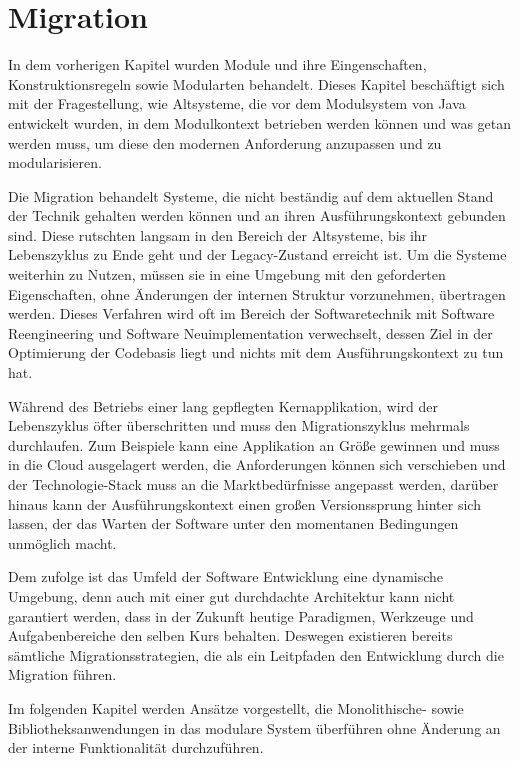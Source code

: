 \chapter{Migration}

	In dem vorherigen Kapitel wurden Module und ihre Eingenschaften, Konstruktionsregeln sowie Modularten behandelt. Dieses Kapitel beschäftigt sich mit der Fragestellung, wie Altsysteme, die vor dem Modulsystem von Java entwickelt wurden, in dem Modulkontext betrieben werden können und was getan werden muss, um diese den modernen Anforderung anzupassen und zu modularisieren.\bigbreak

	Die Migration behandelt Systeme, die nicht beständig auf dem aktuellen Stand der Technik gehalten werden können und an ihren Ausführungskontext gebunden sind. Diese rutschten langsam in den Bereich der Altsysteme, bis ihr Lebenszyklus zu Ende geht und der Legacy-Zustand erreicht ist. Um die Systeme weiterhin zu Nutzen, müssen sie in eine Umgebung mit den geforderten Eigenschaften, ohne Änderungen der internen Struktur vorzunehmen, übertragen werden. Dieses Verfahren wird oft im Bereich der Softwaretechnik mit Software Reengineering und Software Neuimplementation verwechselt, dessen Ziel in der Optimierung der Codebasis liegt und nichts mit dem Ausführungskontext zu tun hat. \bigbreak

	Während des Betriebs einer lang gepflegten Kernapplikation, wird der Lebenszyklus öfter überschritten und muss den Migrationszyklus mehrmals durchlaufen. Zum Beispiele kann eine Applikation an Größe gewinnen und muss in die Cloud ausgelagert werden, die Anforderungen können sich verschieben und der Technologie-Stack muss an die Marktbedürfnisse angepasst werden, darüber hinaus kann der Ausführungskontext einen großen Versionssprung hinter sich lassen, der das Warten der Software unter den momentanen Bedingungen unmöglich macht. \newline

	Dem zufolge ist das Umfeld der Software Entwicklung eine dynamische Umgebung, denn auch mit einer gut durchdachte Architektur kann nicht garantiert werden, dass in der Zukunft heutige Paradigmen, Werkzeuge und Aufgabenbereiche den selben Kurs behalten. Deswegen existieren bereits sämtliche Migrationsstrategien, die als ein Leitpfaden den Entwicklung durch die Migration führen. \bigbreak

	Im folgenden Kapitel werden Ansätze vorgestellt, die Monolithische- sowie Bibliotheksanwendungen in das modulare System überführen ohne Änderung an der interne Funktionalität durchzuführen. 


